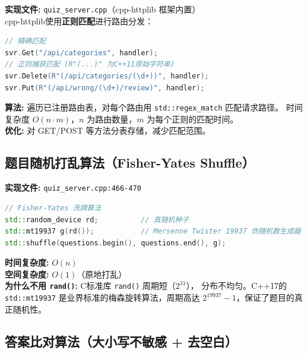\documentclass[12pt,a4paper]{ctexart}
\begin{document}
\begin{algobox}
\textbf{实现文件:} \texttt{quiz\_server.cpp}（cpp-httplib 框架内置）\\[4pt]
cpp-httplib使用\textbf{正则匹配}进行路由分发：

\begin{lstlisting}[language=C++,basicstyle=\ttfamily\small]
// 精确匹配
svr.Get("/api/categories", handler);
// 正则捕获匹配 (R"(...)" 为C++11原始字符串)
svr.Delete(R"(/api/categories/(\d+))", handler);
svr.Put(R"(/api/wrong/(\d+)/review)", handler);
\end{lstlisting}

\textbf{算法:} 遍历已注册路由表，对每个路由用 \texttt{std::regex\_match} 匹配请求路径。
时间复杂度 $O(n \cdot m)$，$n$ 为路由数量，$m$ 为每个正则的匹配时间。\\
\textbf{优化:} 对 GET/POST 等方法分表存储，减少匹配范围。
\end{algobox}

\subsection{题目随机打乱算法（Fisher-Yates Shuffle）}

\begin{algobox}
\textbf{实现文件:} \texttt{quiz\_server.cpp:466-470}\\[4pt]
\begin{lstlisting}[language=C++,basicstyle=\ttfamily\small]
// Fisher-Yates 洗牌算法
std::random_device rd;          // 真随机种子
std::mt19937 g(rd());           // Mersenne Twister 19937 伪随机数生成器
std::shuffle(questions.begin(), questions.end(), g);
\end{lstlisting}

\textbf{时间复杂度:} $O(n)$\\
\textbf{空间复杂度:} $O(1)$（原地打乱）\\[4pt]
\textbf{为什么不用 \texttt{rand()}:} C标准库 \texttt{rand()} 周期短（$2^{31}$），
分布不均匀。C++17的 \texttt{std::mt19937} 是业界标准的梅森旋转算法，周期高达
$2^{19937}-1$，保证了题目的真正随机性。
\end{algobox}

\subsection{答案比对算法（大小写不敏感 + 去空白）}
\end{document}
